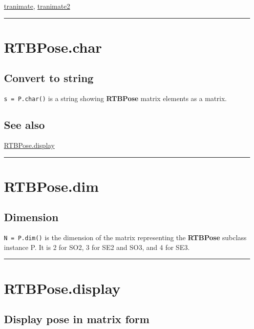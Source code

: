 \hyperlink{tranimate}{\color{blue} tranimate}, \hyperlink{tranimate2}{\color{blue} tranimate2}

\vspace{1.5ex}\hrule

\hypertarget{RTBPose.char}{\section*{RTBPose.char}}
\subsection*{Convert to string}


\texttt{s = P.char()} is a string showing \textbf{\color{red} RTBPose} matrix elements as
a matrix.


\subsection*{See also}


\hyperlink{RTBPose.display}{\color{blue} RTBPose.display}

\vspace{1.5ex}\hrule

\hypertarget{RTBPose.dim}{\section*{RTBPose.dim}}
\subsection*{Dimension}


\texttt{N = P.dim()} is the dimension of the matrix representing the \textbf{\color{red} RTBPose}
subclass instance P.  It is 2 for SO2, 3 for SE2 and SO3, and 4 for SE3.

\vspace{1.5ex}\hrule

\hypertarget{RTBPose.display}{\section*{RTBPose.display}}
\subsection*{Display pose in matrix form}



